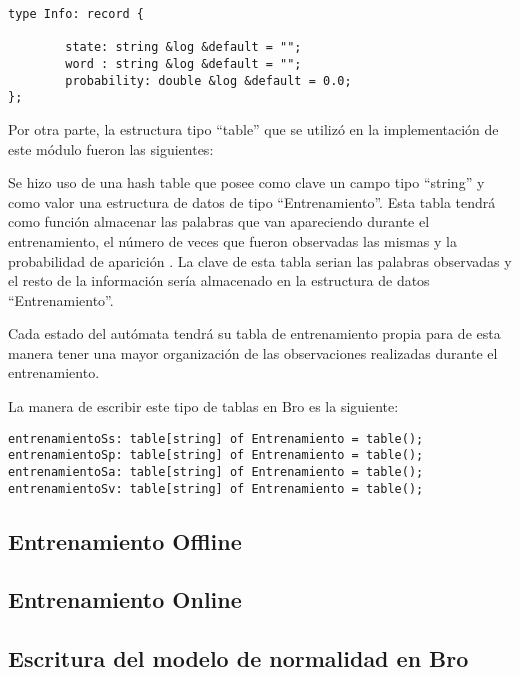 \begin{verbatim}
type Info: record {

        state: string &log &default = "";
        word : string &log &default = "";
        probability: double &log &default = 0.0;
};
\end{verbatim}

Por otra parte, la estructura tipo “table” que se utilizó en la implementación de este módulo fueron las siguientes:

Se hizo uso de una hash table que posee como clave un campo tipo “string” y como valor una estructura de datos de tipo “Entrenamiento”. Esta tabla tendrá como función almacenar las palabras que van apareciendo durante el entrenamiento, el número de veces que fueron observadas las mismas y la probabilidad de aparición . La clave de esta tabla serian las palabras observadas y el resto de la información sería almacenado en la estructura de datos “Entrenamiento”.

Cada estado del autómata tendrá su tabla de entrenamiento propia para de esta manera tener una mayor organización de las observaciones realizadas durante el entrenamiento.

La manera de escribir este tipo de tablas en Bro es la siguiente:

\begin{verbatim}
entrenamientoSs: table[string] of Entrenamiento = table();
entrenamientoSp: table[string] of Entrenamiento = table();
entrenamientoSa: table[string] of Entrenamiento = table();
entrenamientoSv: table[string] of Entrenamiento = table();
\end{verbatim}

\subsection{Entrenamiento Offline}

\subsection{Entrenamiento Online}\label{sec:entrenamientoOffline}

\subsection{Escritura del modelo de normalidad en Bro}

